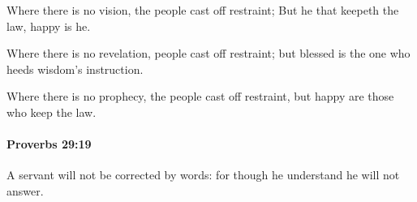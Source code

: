 			\begin{versebox}
					\item[BHS] 
					\item[ASV] Where there is no vision, the people cast off restraint; But he that keepeth the law, happy is he.
					\item[NIV] Where there is no revelation, people cast off restraint; but blessed is the one who heeds wisdom’s instruction.
					\item[NRSV] Where there is no prophecy, the people cast off restraint, but happy are those who keep the law.
			\end{versebox}

		\paragraph{Proverbs 29:19} %
			\label{PROVERBS-29-19}

			A servant will not be corrected by words: for though he understand he will not answer.

